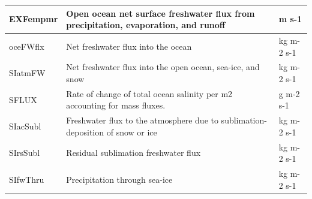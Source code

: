 \begin{longtable}{|m{}|m{}|m{}|}
EXFempmr &Open ocean net surface freshwater flux from precipitation, evaporation, and runoff &m s-1  \\ \hline
oceFWflx &Net freshwater flux into the ocean &kg m-2 s-1  \\ \hline
SIatmFW &Net freshwater flux into the open ocean, sea-ice, and snow &kg m-2 s-1  \\ \hline
SFLUX &Rate of change of total ocean salinity per m2 accounting for mass fluxes. &g m-2 s-1  \\ \hline
SIacSubl &Freshwater flux to the atmosphere due to sublimation-deposition of snow or ice &kg m-2 s-1  \\ \hline
SIrsSubl &Residual sublimation freshwater flux &kg m-2 s-1  \\ \hline
SIfwThru &Precipitation through sea-ice &kg m-2 s-1  \\ \hline
\end{longtable}

\newp
\pagebreak
